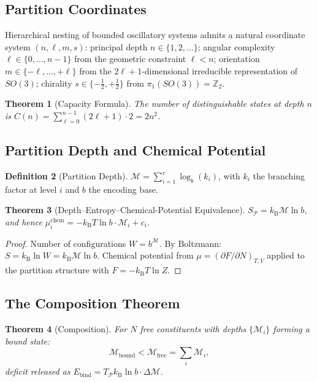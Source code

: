 \documentclass[twocolumn,10pt,a4paper]{article}
\newtheorem{theorem}{Theorem}[section]
\theoremstyle{definition}
\newtheorem{definition}[theorem]{Definition}
\theoremstyle{remark}
\newcommand{\kB}{k_{\mathrm{B}}}
\newcommand{\Depth}{\mathcal{M}}
\newcommand{\Partition}{\mathcal{P}}
\begin{document}
\subsection{Partition Coordinates}

Hierarchical nesting of bounded oscillatory systems admits a natural coordinate system $(n,\ell,m,s)$: principal depth $n\in\{1,2,\ldots\}$; angular complexity $\ell\in\{0,\ldots,n-1\}$ from the geometric constraint $\ell < n$; orientation $m\in\{-\ell,\ldots,+\ell\}$ from the $2\ell+1$-dimensional irreducible representation of $SO(3)$; chirality $s\in\{-\tfrac{1}{2},+\tfrac{1}{2}\}$ from $\pi_1(SO(3))=\mathbb{Z}_2$.

\begin{theorem}[Capacity Formula]
The number of distinguishable states at depth $n$ is $C(n) = \sum_{\ell=0}^{n-1}(2\ell+1)\cdot 2 = 2n^2$.
\end{theorem}

\subsection{Partition Depth and Chemical Potential}

\begin{definition}[Partition Depth]
$\Depth = \sum_{i=1}^{r}\log_b(k_i)$, with $k_i$ the branching factor at level $i$ and $b$ the encoding base.
\end{definition}

\begin{theorem}[Depth--Entropy--Chemical-Potential Equivalence]
$S_\Partition = \kB\Depth\ln b$, and hence $\mu_i^{\mathrm{chem}} = -\kB T\ln b\cdot\Depth_i + c_i$.
\end{theorem}

\begin{proof}
Number of configurations $W = b^\Depth$. By Boltzmann: $S = \kB\ln W = \kB\Depth\ln b$. Chemical potential from $\mu = (\partial F/\partial N)_{T,V}$ applied to the partition structure with $F = -\kB T\ln Z$.
\end{proof}

\subsection{The Composition Theorem}

\begin{theorem}[Composition]
For $N$ free constituents with depths $\{\Depth_i\}$ forming a bound state:
\begin{equation}
    \Depth_{\mathrm{bound}} < \Depth_{\mathrm{free}} = \sum_i\Depth_i,
\end{equation}
deficit released as $E_{\mathrm{bind}} = T_\Partition\kB\ln b\cdot\Delta\Depth$.
\end{theorem}
\end{document}
